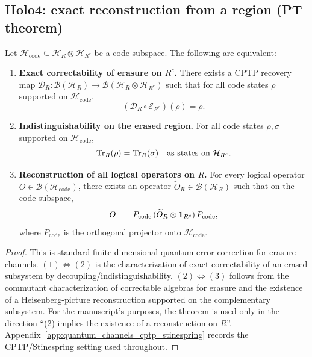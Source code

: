 \subsection{Holo4: exact reconstruction from a region (PT theorem)}
\label{subsec:holo4_exact_reconstruction}

\begin{theorem}
\label{thm:holo_erasure_qec_equivalences}
\MathTag Let $\mathcal{H}_{\mathrm{code}}\subseteq \mathcal{H}_R\otimes\mathcal{H}_{R^c}$ be a code subspace.
The following are equivalent:
\begin{enumerate}
\item \textbf{Exact correctability of erasure on $R^c$.}
There exists a CPTP recovery map $\mathcal{D}_R:\mathcal{B}(\mathcal{H}_R)\to \mathcal{B}(\mathcal{H}_R\otimes\mathcal{H}_{R^c})$
such that for all code states $\rho$ supported on $\mathcal{H}_{\mathrm{code}}$,
\[
(\mathcal{D}_R\circ \mathcal{E}_{R^c})(\rho)=\rho.
\]
\item \textbf{Indistinguishability on the erased region.}
For all code states $\rho,\sigma$ supported on $\mathcal{H}_{\mathrm{code}}$,
\[
\mathrm{Tr}_{R}(\rho)=\mathrm{Tr}_{R}(\sigma)\quad\text{as states on }\mathcal{H}_{R^c}.
\]
\item \textbf{Reconstruction of all logical operators on $R$.}
For every logical operator $O\in\mathcal{B}(\mathcal{H}_{\mathrm{code}})$, there exists an operator
$\widetilde O_R\in\mathcal{B}(\mathcal{H}_R)$ such that on the code subspace,
\[
O\ =\ P_{\mathrm{code}}\,(\widetilde O_R\otimes \ind_{R^c})\,P_{\mathrm{code}},
\]
where $P_{\mathrm{code}}$ is the orthogonal projector onto $\mathcal{H}_{\mathrm{code}}$.
\end{enumerate}
\end{theorem}

\begin{proof}
This is standard finite-dimensional quantum error correction for erasure channels.
$(1)\Leftrightarrow(2)$ is the characterization of exact correctability of an erased subsystem by decoupling/indistinguishability.
$(2)\Leftrightarrow(3)$ follows from the commutant characterization of correctable algebras for erasure and the existence of a
Heisenberg-picture reconstruction supported on the complementary subsystem.
For the manuscript's purposes, the theorem is used only in the direction ``(2) implies the existence of a reconstruction on $R$''.
Appendix~\ref{app:quantum_channels_cptp_stinespring} records the CPTP/Stinespring setting used throughout.
\end{proof}

